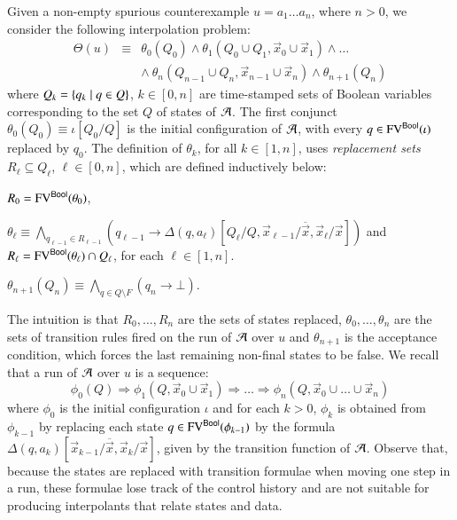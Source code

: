 \documentclass[10pt]{llncs}
\begin{document}
Given a non-empty spurious counterexample $u = a_1\ldots a_n$, where
$n>0$, we consider the following interpolation problem: 
\begin{eqnarray}\label{eq:interpolation-problem}
\Theta(u) & \equiv & \theta_0(Q_0) \wedge \theta_1(Q_0 \cup Q_1,\vec{x}_0
\cup \vec{x}_1) \wedge \ldots \\ 
&& \wedge~ \theta_n(Q_{n-1} \cup Q_n,\vec{x}_{n-1} \cup \vec{x}_n) \wedge \theta_{n+1}(Q_n) \nonumber
\end{eqnarray}
where $Q_k = \left\{ q_k \mid q \in Q \right\}$, $k \in [0,n]$ are time-stamped
sets of Boolean variables corresponding to the set $Q$ of states of
$\mathcal{A}$. The first conjunct $\theta_0(Q_0) \equiv \iota[Q_0/Q]$ is the
initial configuration of $\mathcal{A}$, with every $q \in \mathrm{FV}^{\mathsf{Bool}}(\iota)$
replaced by $q_0$. The definition of $\theta_k$, for all $k\in[1,n]$,
uses \emph{replacement sets} $R_\ell \subseteq Q_\ell$, $\ell\in
[0,n]$, which are defined inductively below: \begin{compactitem}
\item $R_0 = \mathrm{FV}^{\mathsf{Bool}}(\theta_0)$,
%
\item $\theta_\ell \equiv \bigwedge_{q_{\ell-1}\in R_{\ell-1}}
  (q_{\ell-1} \rightarrow
  \Delta(q,a_\ell)[Q_\ell/Q,\vec{x}_{\ell-1}/\overline{\vec{x}},\vec{x}_\ell/\vec{x}])$
  and $R_\ell = \mathrm{FV}^{\mathsf{Bool}}(\theta_\ell) \cap Q_\ell$, for each
  $\ell\in[1,n]$.
%
\item $\theta_{n+1}(Q_n) \equiv \bigwedge_{q \in Q \setminus F} (q_n
  \rightarrow \bot)$.
\end{compactitem}
The intuition is that $R_0,\ldots,R_n$ are the sets of states
replaced, $\theta_0, \ldots, \theta_n$ are the sets of transition
rules fired on the run of $\mathcal{A}$ over $u$ and $\theta_{n+1}$ is the
acceptance condition, which forces the last remaining non-final states
to be false.
%
%
%
We recall that a run of $\mathcal{A}$ over $u$ is a sequence: \[\phi_0(Q)
\Rightarrow \phi_1(Q,\vec{x}_0\cup\vec{x}_1) \Rightarrow \ldots
\Rightarrow \phi_n(Q,\vec{x}_0\cup\ldots\cup\vec{x}_n)\] where
$\phi_0$ is the initial configuration $\iota$ and for each $k>0$,
$\phi_k$ is obtained from $\phi_{k-1}$ by replacing each state $q \in
\mathrm{FV}^{\mathsf{Bool}}(\phi_{k-1})$ by the formula
$\Delta(q,a_k)[\vec{x}_{k-1}/\overline{\vec{x}},\vec{x}_k/\vec{x}]$,
given by the transition function of $\mathcal{A}$. Observe that, because the
states are replaced with transition formulae when moving one step in a
run, these formulae lose track of the control history and are not
suitable for producing interpolants that relate states and data.
\end{document}
